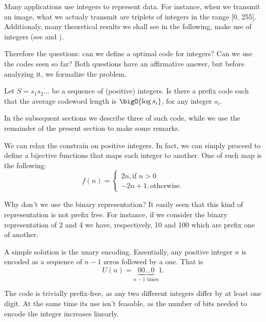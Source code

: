 \documentclass{subfiles}
\begin{document}
\label{sec:integersEncoding}
    Many applications use integers to represent data. For instance,
        when we transmit an image, what we actualy transmit are triplets of 
        integers in the range [0, 255]. Additionaly, 
        many theoretical results we shall see in the following,
        make use of integers (see  and ).

    Therefore the questions: can we define a optimal code for integers?
        Can we use the codes seen so far? Both questions have an affirmative answer,
        but before analyzing it, we formalize the problem.
        
    Let \(S = s_{1}s_{2}\ldots\) be a sequence of (positive) integers.
        Is there a prefix code such that the average codeword length is 
        \(\bigO{\log s_{i}}\), for any integer \(s_{i}\).

    In the subsequent sections we describe three of such code,
        while we use the remainder of the present section to make some remarks.

    \begin{remark*}
        We can relax the constrain on positive integers. In fact, 
            we can simply proceed to define a bijective functions 
            that maps each integer to another. 
            One of such map is the following:
            \[
                f(n) = \begin{cases}
                    2n, \text{if } n > 0 \\
                    -2n + 1, \text{otherwise.} 
                \end{cases}
            \]
    \end{remark*}

    \begin{remark*}
        Why don't we use the binary representation? 
            It easily seen that this kind of representation is not prefix free.
            For instance, if we consider the binary representation of 2 and 4
            we have, respectively, 10 and 100 which are prefix one of another.
    \end{remark*}

    A simple solution is the unary encoding. 
        Essentially, any positive integer \(n\) is encoded as a sequence of \(n - 1\) zeros 
        followed by a one. That is 
        \[
            U(n) = \underbrace{00\ldots0}_{n - 1 \text{ times}}1.
        \]

    The code is trivially prefix-free, as any two different integers 
        differ by at least one digit. At the same time its use isn't feasable,
        as the number of bits needed to encode the integer increases linearly.
\end{document}
